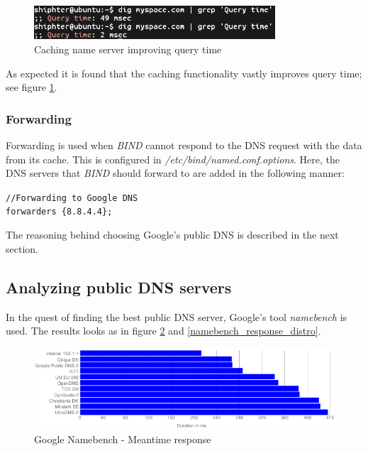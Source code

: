 \begin{figure}[ht!]
\centering
\includegraphics[width=90mm]{img/dig_caching_querytime.png}
\caption{Caching name server improving query time}
\label{dig_caching_querytime}
\end{figure}

As expected it is found that the caching functionality vastly improves query time; see figure \ref{dig_caching_querytime}.

\subsubsection{Forwarding}
Forwarding is used when \emph{BIND} cannot respond to the DNS request with the data from its cache. This is configured in \emph{/etc/bind/named.conf.options}. Here, the DNS servers that \emph{BIND} should forward to are added in the following manner:

\texttt{//Forwarding to Google DNS} \\
\texttt{forwarders \{8.8.4.4\};}

The reasoning behind choosing Google's public DNS is described in the next section.

\subsection{Analyzing public DNS servers}
In the quest of finding the best public DNS server, Google's tool \emph{namebench} is used. The results looks as in figure \ref{namebench_meantime_response_chart} and \ref{namebench_response_distro}.

\begin{figure}[H]
\centering
\includegraphics[width=150mm]{img/namebench_meantime_response_chart.png}
\caption{Google Namebench - Meantime response}
\label{namebench_meantime_response_chart}
\end{figure}

